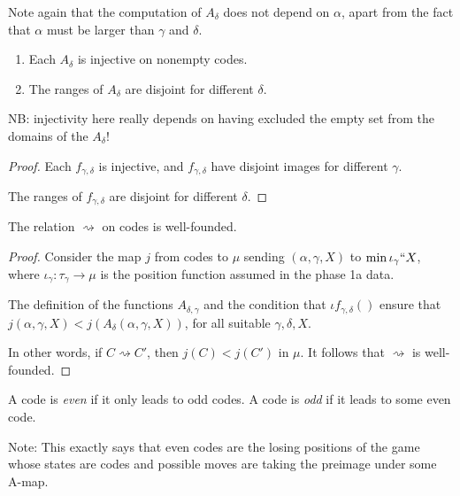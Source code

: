 Note again that the computation of $A_\delta$ does not depend on $\alpha$, apart from the fact that $\alpha$ must be larger than $\gamma$ and $\delta$.

\begin{lemma}
\label {lem:a-map-properties}
\leanok
\begin{enumerate}
\item Each $A_\delta$ is injective on nonempty codes.
\item The ranges of $A_\delta$ are disjoint for different $\delta$.
\end{enumerate}

NB: injectivity here really depends on having excluded the empty set from the domains of the $A_\delta$!
\end{lemma}
\begin{proof}
\leanok
\item Each $f_{\gamma,\delta}$ is injective, and $f_{\gamma,\delta}$ have disjoint images for different $\gamma$.
\item The ranges of $f_{\gamma,\delta}$ are disjoint for different $\delta$.
\end{proof}

\begin{lemma}
\label{lem:a-map-wf}
\leanok
The relation $\rightsquigarrow$ on codes is well-founded.
\end{lemma}

\begin{proof}
\leanok
  Consider the map $j$ from codes to $\mu$ sending $(\alpha,\gamma,X)$ to $\min \iota_\gamma``X$, where $\iota_\gamma : \tau_\gamma \to \mu$ is the position function assumed in the phase 1a data.

  The definition of the functions $A_{\delta,\gamma}$ and the condition that $\iota f_{\gamma,\delta}()$ ensure that $j(\alpha,\gamma,X) < j(A_\delta(\alpha,\gamma,X))$, for all suitable $\gamma,\delta,X$.

  In other words, if $C \rightsquigarrow C'$, then $j(C) < j(C')$ in $\mu$.  It follows that $\rightsquigarrow$ is well-founded.
\end{proof}

\begin{definition}
\label {def:code-parity}
\leanok
A code is \emph{even} if it only leads to odd codes. A code is \emph{odd} if it leads to some even code.

Note: This exactly says that even codes are the losing positions of the game whose states are codes
and possible moves are taking the preimage under some A-map.
\end{definition}

